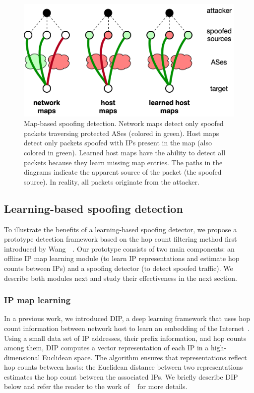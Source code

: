 \begin{figure}
	\centering
	\includegraphics[width=.8\linewidth]{Graph/spoof/learnedmaps.png}
	\caption{Map-based spoofing detection. Network maps detect only spoofed packets traversing protected ASes (colored in green). Host maps detect only packets spoofed with IPs present in the map (also colored in green). Learned host maps have the ability to detect all packets because they learn missing map entries. The paths in the diagrams indicate the apparent source of the packet (the spoofed source). In reality, all packets originate from the attacker.}
	\label{fig:learnedmaps}
	\vspace{0.5cm}
\end{figure}

\subsection{Learning-based spoofing detection}
\label{spoof:design}

To illustrate the benefits of a learning-based spoofing detector, we propose a prototype detection framework based on the hop count filtering method first introduced by Wang~\etal{}~\citep{hcf}.
Our prototype consists of two main components: an offline IP map learning module (to learn IP representations and estimate hop counts between IPs) and a spoofing detector (to detect spoofed traffic). We describe both modules next and study their effectiveness in the next section. 



\subsubsection{IP map learning}

In a previous work, we introduced DIP, a deep learning framework that uses hop count information between network host to learn an embedding of the Internet~\citep{dip}. Using a small data set of IP addresses, their prefix information, and hop counts among them, DIP computes a vector representation of each IP in a high-dimensional Euclidean space. The algorithm ensures that representations reflect hop counts between hosts: the Euclidean distance between two representations estimates the hop count between the associated IPs. We briefly describe DIP below and refer the reader to the work of ~\citet{dip, dip-ccr} for more details.


